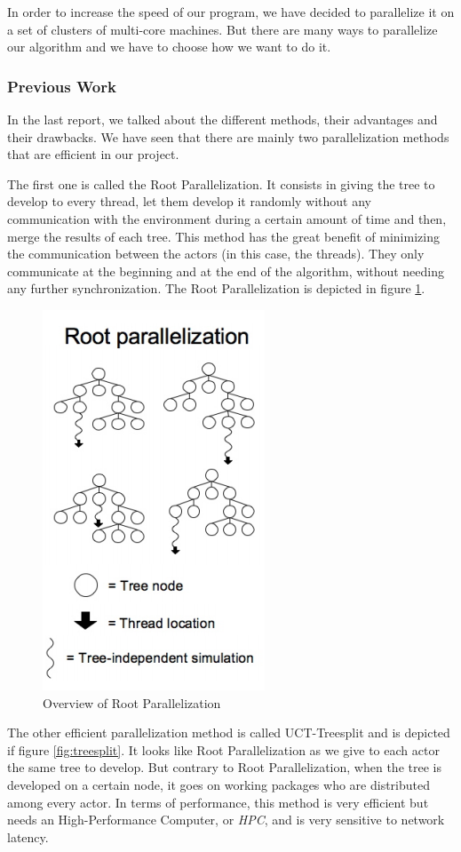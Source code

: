 In order to increase the speed of our program, we have decided to parallelize it on a set of clusters of multi-core machines. But there are many ways to parallelize our algorithm and we have to choose how we want to do it. 
\subsubsection{Previous Work}
In the last report, we talked about the different methods, their advantages and their drawbacks. We have seen that there are mainly two parallelization methods that are efficient in our project.

The first one is called the Root Parallelization. It consists in giving the tree to develop to every thread, let them develop it randomly without any communication with the environment
during a certain amount of time and then, merge the results of each tree.
This method has the great benefit of minimizing the communication between the actors (in this case, the threads).
They only communicate at the beginning and at the end of the algorithm, without needing any further synchronization. The Root Parallelization is depicted in figure \ref{fig:root}.

\begin{figure}[!h] 
\centerline{\includegraphics[scale=0.60]{3Methods/3.1Parallelization_Method/root.png}}
   \caption{Overview of Root Parallelization}
\label{fig:root}
\end{figure}

The other efficient parallelization method is called UCT-Treesplit and is depicted if figure \ref{fig:treesplit}. It looks like Root Parallelization as we give to each actor the same tree to develop.
But contrary to Root Parallelization, when the tree is developed on a certain node, it goes on working packages who are distributed among every actor. %
In terms of performance, this method is very efficient but needs an High-Performance Computer, or \emph{HPC}, and is very sensitive to network latency.

